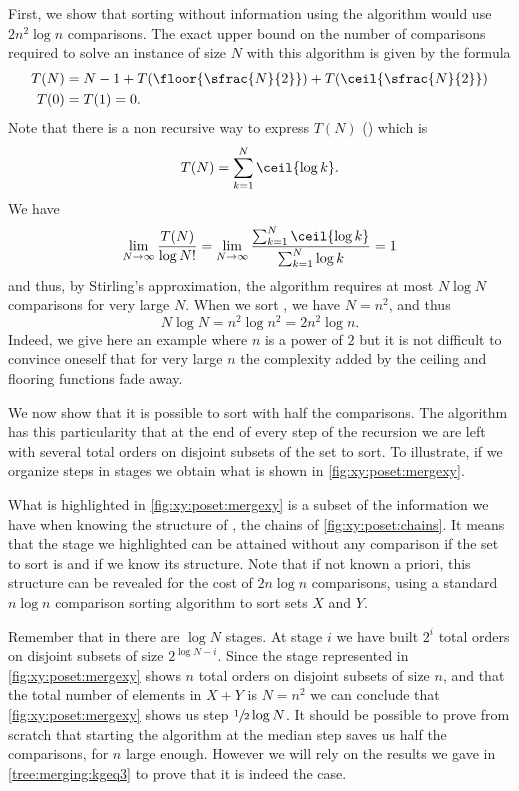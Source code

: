 First, we show that sorting \XY without information using the \mergesort algorithm would use $2
n^2 \log n$ comparisons. The exact upper bound on the number
of comparisons required to solve an instance of size \(N\) with this algorithm
is given by the formula
\begin{align*}
T(N) &= N - 1 + T(\floor{\sfrac{N}{2}}) + T(\ceil{\sfrac{N}{2}})\\
T(0) &= T(1) = 0.
\end{align*}
Note that there is a non recursive way to express \(T(N)\) (\citet*{OEIS:A001855}) which is
\begin{displaymath}
T(N) = \sum_{k=1}^{N} \ceil{\log k}.
\end{displaymath}
We have
\begin{displaymath}
\lim_{N\to\infty}\frac{T(N)}{\log N!} =
\lim_{N\to\infty}\frac{\sum_{k=1}^{N}\ceil{\log k}}{ \sum_{k=1}^{N} \log k} = 1
\end{displaymath}
and thus, by Stirling's approximation, the \mergesort algorithm requires at
most \(N \log N\) comparisons for very large \(N\). When we sort \XY, we have \(N =
n^2\), and thus
\[N \log N = n^2 \log n^2 = 2 n^2 \log n.\]
Indeed, we give here an example where \(n\) is a power of \(2\) but it is not
difficult to convince oneself that for very large \(n\) the complexity added
by the ceiling and flooring functions fade away.

We now show that it is possible to sort \XY with half the comparisons. The
\mergesort algorithm has this particularity that at the end of every step of
the recursion we are left with several total orders on disjoint subsets of the
set to sort. To illustrate, if we organize steps in stages we obtain what is
shown in \ref{fig:xy:poset:mergexy}.

What is highlighted in \ref{fig:xy:poset:mergexy} is a subset of the
information we have when knowing the structure of \XY, \ie the chains of
\ref{fig:xy:poset:chains}. It means that the stage we
highlighted can be attained without any comparison if the set to sort is \XY
and if we know its structure. Note that if not known a priori, this structure
can be revealed for the cost of \(2n \log n\) comparisons, using a standard \(n
\log n\) comparison sorting algorithm to sort sets \(X\) and \(Y\).

Remember that in \mergesort there are $\log N$ stages. At stage $i$ we have
built $2^{i}$ total orders on disjoint subsets of size $2^{\log N - i}$. Since
the stage represented in \ref{fig:xy:poset:mergexy} shows $n$ total orders on
disjoint subsets of size $n$, and that the total number of elements in $X+Y$ is
$N = n^2$ we can conclude that \ref{fig:xy:poset:mergexy} shows us step
$\sfrac{1}{2} \log N$. It should be possible to prove from scratch that
starting the algorithm at the median step saves us half the comparisons, for
\(n\) large enough. However we will rely on the results we gave
in \ref{tree:merging:kgeq3} to prove that it is indeed the case.

